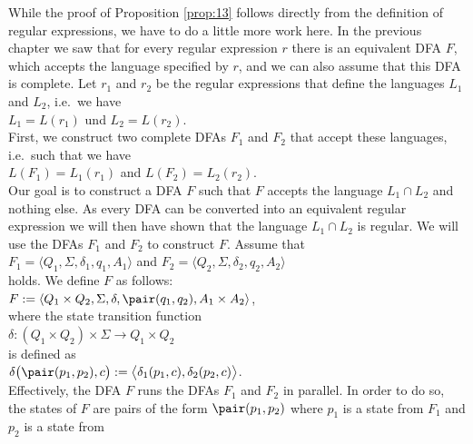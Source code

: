 \proofEng
While the proof of Proposition \ref{prop:13} follows directly from the definition of regular expressions,
we have to do a little more work here. In the previous chapter we saw that for every regular expression
$r$ there is an equivalent \textsc{DFA} $F$, which accepts the language specified by $r$,
and we can also assume that this \textsc{DFA} is complete. Let $r_1$ and $r_2$ be the regular expressions that
define the languages $L_1$ and $L_2$, i.e.~we have
\\[0.2cm]
\hspace*{1.3cm}
$L_1 = L(r_1)$ \quad und \quad $L_2 = L(r_2)$.
\\[0.2cm]
First, we construct two complete \textsc{DFA}s
$F_1$ and $F_2$ that accept these languages, i.e.~such that we have
\\[0.2cm]
\hspace*{1.3cm}
$L(F_1) = L_1(r_1)$ \quad and \quad $L(F_2) = L_2(r_2)$.
\\[0.2cm]
Our goal is to construct a \textsc{DFA} $F$ such that $F$ accepts the language
$L_1 \cap L_2$ and nothing else.  As every \textsc{DFA} can be converted into an equivalent regular
expression we will then have shown that the language
$L_1 \cap L_2$ is regular.  We will use the \textsc{DFA}s $F_1$ and $F_2$ to construct $F$.
Assume that
\\[0.2cm]
\hspace*{1.3cm}
$F_1 = \langle Q_1, \Sigma, \delta_1, q_1, A_1 \rangle$ \quad and \quad
$F_2 = \langle Q_2, \Sigma, \delta_2, q_2, A_2 \rangle$
\\[0.2cm]
holds.  We define $F$ as follows:
\\[0.2cm]
\hspace*{1.3cm}
$F := \langle Q_1 \times Q_2, \Sigma, \delta, \pair(q_1,q_2), A_1 \times A_2 \rangle$,
\\[0.2cm]
where the state transition function 
\\[0.2cm]
\hspace*{1.3cm}
 $\delta: (Q_1 \times Q_2) \times \Sigma \rightarrow Q_1 \times Q_2$ 
\\[0.2cm]
is defined as
\\[0.2cm]
\hspace*{1.3cm}
$\delta\bigl( \pair(p_1, p_2), c \bigr) := \bigl\langle\delta_1(p_1,c), \delta_2(p_2,c)\bigr\rangle$.
\\[0.2cm]
Effectively, the \textsc{DFA} $F$ runs the \textsc{DFA}s $F_1$ and $F_2$ in parallel.  In order to do so, the
states of $F$ are pairs of the form $\pair(p_1,p_2)$ where $p_1$ is a state from $F_1$ and $p_2$ is a state from
